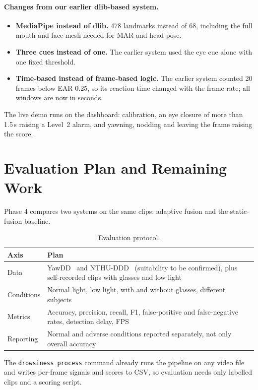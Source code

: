 \documentclass[12pt,a4paper]{article}
\newcommand{\code}[1]{\texttt{#1}}
\begin{document}
\paragraph{Changes from our earlier dlib-based system.}
\begin{itemize}
\item \textbf{MediaPipe instead of dlib.} 478 landmarks instead of 68, including the full mouth and face mesh needed for MAR and head pose.
\item \textbf{Three cues instead of one.} The earlier system used the eye cue alone with one fixed threshold.
\item \textbf{Time-based instead of frame-based logic.} The earlier system counted 20 frames below EAR 0.25, so its reaction time changed with the frame rate; all windows are now in seconds.
\end{itemize}

The live demo runs on the dashboard: calibration, an eye closure of more than 1.5\,s raising a Level~2 alarm, and yawning, nodding and leaving the frame raising the score.

\section{Evaluation Plan and Remaining Work}

Phase 4 compares two systems on the same clips: adaptive fusion and the static-fusion baseline.

\begin{table}[htbp]
\centering
\caption{Evaluation protocol.}
\label{tab:eval}
\begin{tabularx}{\textwidth}{lX}
\toprule
Axis & Plan \\
\midrule
Data & YawDD~\cite{yawdd} and NTHU-DDD~\cite{nthu} (suitability to be confirmed), plus self-recorded clips with glasses and low light \\
Conditions & Normal light, low light, with and without glasses, different subjects \\
Metrics & Accuracy, precision, recall, F1, false-positive and false-negative rates, detection delay, FPS \\
Reporting & Normal and adverse conditions reported separately, not only overall accuracy \\
\bottomrule
\end{tabularx}
\end{table}

The \code{drowsiness process} command already runs the pipeline on any video file and writes per-frame signals and scores to CSV, so evaluation needs only labelled clips and a scoring script.
\end{document}
